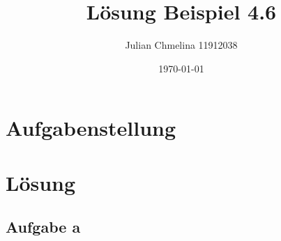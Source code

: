 \documentclass[a4paper,11pt]{article}
\title{Lösung Beispiel 4.6}
\author{Julian Chmelina 11912038}
\date{\today}
\begin{document}
\maketitle
\section{Aufgabenstellung}
\section{Lösung}
\subsection{Aufgabe a}
\end{document}
